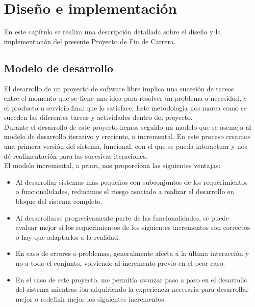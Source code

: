 \cleardoublepage
\chapter{Diseño e implementación}
\label{chap:design_implement}


En este capítulo se realiza una descripción detallada sobre el diseño y la implementación del presente Proyecto de Fin de Carrera.\\


\section{Modelo de desarrollo} 
\label{subsec:modelo_desarrollo}

El desarrollo de un proyecto de software libre implica una sucesión de tareas entre el momento que se tiene una idea para resolver un problema o necesidad, y el producto u servicio final que lo satisface. Este metodología nos marca como se suceden las diferentes tareas y actividades dentro del proyecto.\\


Durante el desarrollo de este proyecto hemos seguido un modelo que se asemeja al modelo de desarrollo iterativo y creciente, o incremental.  En este proceso creamos una primera versión del sistema, funcional, con el que se pueda interactuar y nos dé realimentación para las sucesivas iteraciones.\\


El modelo incremental, a priori, nos proporciona las siguientes ventajas:\\

\begin{itemize}
\item Al desarrollar sistemas más pequeños con subconjuntos de los requerimientos o funcionalidades, reducimos el riesgo asociado a realizar el desarrollo en bloque del sistema completo.\\

\item Al desarrollarse progresivamente parte de las funcionalidades, se puede evaluar mejor si los requerimientos de los siguientes incrementos son correctos o hay que adaptarlos a la realidad.\\

\item En caso de errores o problemas, generalmente afecta a la última interacción y no a todo el conjunto, volviendo al incremento previo en el peor caso.\\

\item En el caso de este proyecto, me permitía avanzar paso a paso en el desarrollo del sistema mientras iba adquiriendo la experiencia necesaria para desarrollar mejor o redefinir mejor los siguientes incrementos.\\
\end{itemize}



